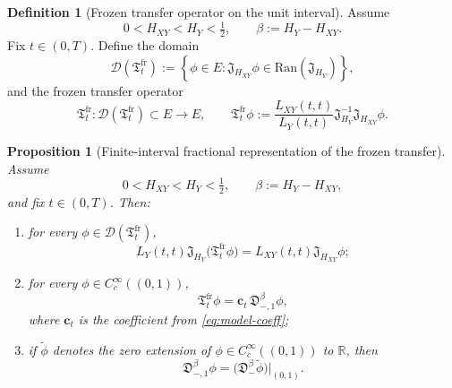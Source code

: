 \documentclass[11pt,a4paper]{amsart}
\theoremstyle{plain}
\newtheorem{proposition}[theorem]{Proposition}
\theoremstyle{definition}
\newtheorem{definition}[theorem]{Definition}
\theoremstyle{remark}
\newcommand{\R}{\mathbb{R}}
\begin{document}
\begin{definition}[Frozen transfer operator on the unit interval]
\label{def:frozen-transfer}
Assume
\[
0<H_{XY}<H_Y<\tfrac12,
\qquad
\beta:=H_Y-H_{XY}.
\]
Fix $t\in(0,T)$. Define the domain
\begin{equation}\label{eq:frozen-domain}
\mathcal D(\mathfrak T_t^{\mathrm{fr}})
:=
\left\{
\phi\in E:\mathfrak J_{H_{XY}}\phi\in\mathrm{Ran}(\mathfrak J_{H_Y})
\right\},
\end{equation}
and the frozen transfer operator
\begin{equation}\label{eq:frozen-transfer}
\mathfrak T_t^{\mathrm{fr}}:\mathcal D(\mathfrak T_t^{\mathrm{fr}})\subset E\to E,
\qquad
\mathfrak T_t^{\mathrm{fr}}\phi
:=
\frac{L_{XY}(t,t)}{L_Y(t,t)}
\mathfrak J_{H_Y}^{-1}\mathfrak J_{H_{XY}}\phi.
\end{equation}
\end{definition}

\begin{proposition}[Finite-interval fractional representation of the frozen transfer]
\label{prop:frozen-fractional}
Assume
\[
0<H_{XY}<H_Y<\tfrac12,
\qquad
\beta:=H_Y-H_{XY},
\]
and fix $t\in(0,T)$. Then:
\begin{enumerate}[label=(\roman*)]
\item for every $\phi\in\mathcal D(\mathfrak T_t^{\mathrm{fr}})$,
\begin{equation}\label{eq:frozen-identity}
L_Y(t,t)\mathfrak J_{H_Y}\bigl(\mathfrak T_t^{\mathrm{fr}}\phi\bigr)
=
L_{XY}(t,t)\mathfrak J_{H_{XY}}\phi;
\end{equation}
\item for every $\phi\in C_c^\infty((0,1))$,
\begin{equation}\label{eq:frozen-derivative}
\mathfrak T_t^{\mathrm{fr}}\phi
=
\mathbf c_t\,\mathfrak D_{-,1}^{\beta}\phi,
\end{equation}
where $\mathbf c_t$ is the coefficient from \eqref{eq:model-coeff};
\item if $\widetilde\phi$ denotes the zero extension of $\phi\in C_c^\infty((0,1))$ to $\R$,
then
\begin{equation}\label{eq:frozen-wholeline}
\mathfrak D_{-,1}^{\beta}\phi
=
\bigl(\mathfrak D_-^\beta \widetilde\phi\bigr)\big|_{(0,1)}.
\end{equation}
\end{enumerate}
\end{proposition}
\end{document}
